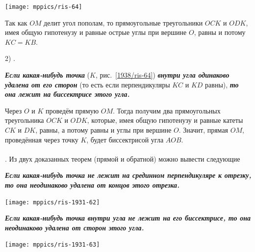 \begin{paracol}{2}
{\medskip

{\centering
\addtocounter{figure}{1}
\texttt{[image: mppics/ris-64]}
\label{1938/ris-64}
\addtocounter{figure}{1}
}

\medskip

Так как $OM$ делит угол пополам, то прямоугольные треугольники $OCK$ и $ODK$, имея общую гипотенузу и равные острые углы при вершине $O$, равны и потому $KC=KB$.

2) .

\textbf{\emph{Если какая-нибудь точка}} ($K$, рис.~\ref{1938/ris-64}) \textbf{\emph{внутри угла одинаково удалена от его сторон}} (то есть если перпендикуляры $KC$ и $KD$ равны), \textbf{\emph{то она лежит на биссектрисе этого угла.}}

Через $O$ и $K$ проведём прямую $OM$.
Тогда получим два прямоугольных треугольника $OCK$ и $ODK$, которые, имея общую гипотенузу и равные катеты $CK$ и $DK$, равны, а потому равны и углы при вершине $O$.
Значит, прямая $OM$, проведённая через точку $K$, будет биссектрисой угла $AOB$.



}
\end{paracol}


\paragraph{}\label{1938/59}
.
Из двух доказанных теорем (прямой и обратной) можно вывести следующие 

\medskip

\begin{paracol}{2}

{\sloppy
\textbf{\emph{Если какая-нибудь точка не лежит на срединном перпендикуляре к отрезку, то она неодинаково удалена от концов этого отрезка.}}

\medskip

{\centering
\texttt{[image: mppics/ris-1931-62]}
\label{1931/ris-62}
\addtocounter{figure}{1}
}



}

\switchcolumn

{\sloppy

\textbf{\emph{Если какая-нибудь точка внутри угла не лежит на его биссектрисе, то она неодинаково удалена от сторон этого угла.}}

\medskip

{\centering
\texttt{[image: mppics/ris-1931-63]}
\label{1931/ris-63}
\addtocounter{figure}{1}
}
}

\end{paracol}
\setlength{\columnseprule}{0pt}

